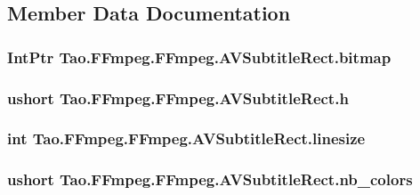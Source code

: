 \subsection{Member Data Documentation}
\hypertarget{struct_tao_1_1_f_fmpeg_1_1_f_fmpeg_1_1_a_v_subtitle_rect_a7a99e2fbe9f9076b59df02c4ee394eee}{
\subsubsection[{bitmap}]{\setlength{\rightskip}{0pt plus 5cm}IntPtr {\bf Tao.FFmpeg.FFmpeg.AVSubtitleRect.bitmap}}}
\label{struct_tao_1_1_f_fmpeg_1_1_f_fmpeg_1_1_a_v_subtitle_rect_a7a99e2fbe9f9076b59df02c4ee394eee}
\hypertarget{struct_tao_1_1_f_fmpeg_1_1_f_fmpeg_1_1_a_v_subtitle_rect_a3840306528f2ef536ab237fafd53f166}{
\subsubsection[{h}]{\setlength{\rightskip}{0pt plus 5cm}ushort {\bf Tao.FFmpeg.FFmpeg.AVSubtitleRect.h}}}
\label{struct_tao_1_1_f_fmpeg_1_1_f_fmpeg_1_1_a_v_subtitle_rect_a3840306528f2ef536ab237fafd53f166}
\hypertarget{struct_tao_1_1_f_fmpeg_1_1_f_fmpeg_1_1_a_v_subtitle_rect_a1757cc39b3008507679461c7038735ad}{
\subsubsection[{linesize}]{\setlength{\rightskip}{0pt plus 5cm}int {\bf Tao.FFmpeg.FFmpeg.AVSubtitleRect.linesize}}}
\label{struct_tao_1_1_f_fmpeg_1_1_f_fmpeg_1_1_a_v_subtitle_rect_a1757cc39b3008507679461c7038735ad}
\hypertarget{struct_tao_1_1_f_fmpeg_1_1_f_fmpeg_1_1_a_v_subtitle_rect_abd2268f28e4f204f64e989544ba6b5bf}{
\subsubsection[{nb\_\-colors}]{\setlength{\rightskip}{0pt plus 5cm}ushort {\bf Tao.FFmpeg.FFmpeg.AVSubtitleRect.nb\_\-colors}}}
